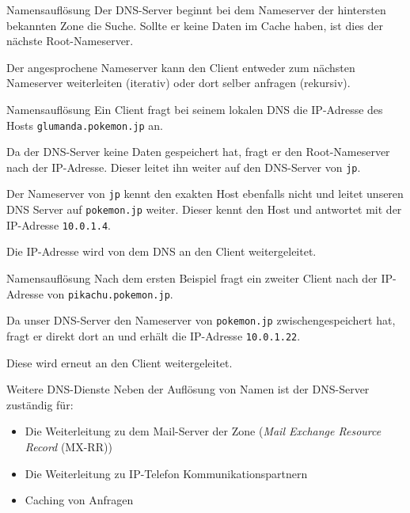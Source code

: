 \begin{defi}{Namensauflösung}
    Der DNS-Server beginnt bei dem Nameserver der hintersten bekannten Zone die Suche.
    Sollte er keine Daten im Cache haben, ist dies der nächste Root-Nameserver.

    Der angesprochene Nameserver kann den Client entweder zum nächsten Nameserver weiterleiten (iterativ) oder dort selber anfragen (rekursiv).
\end{defi}

\begin{example}{Namensauflösung}
    Ein Client fragt bei seinem lokalen DNS die IP-Adresse des Hosts \texttt{glumanda.pokemon.jp} an.

    Da der DNS-Server keine Daten gespeichert hat, fragt er den Root-Nameserver nach der IP-Adresse.
    Dieser leitet ihn weiter auf den DNS-Server von \texttt{jp}.

    Der Nameserver von \texttt{jp} kennt den exakten Host ebenfalls nicht und leitet unseren DNS Server auf \texttt{pokemon.jp} weiter.
    Dieser kennt den Host und antwortet mit der IP-Adresse \texttt{10.0.1.4}.

    Die IP-Adresse wird von dem DNS an den Client weitergeleitet.
\end{example}

\begin{example}{Namensauflösung}
    Nach dem ersten Beispiel fragt ein zweiter Client nach der IP-Adresse von \texttt{pikachu.pokemon.jp}.

    Da unser DNS-Server den Nameserver von \texttt{pokemon.jp} zwischengespeichert hat, fragt er direkt dort an und erhält die IP-Adresse \texttt{10.0.1.22}.

    Diese wird erneut an den Client weitergeleitet.
\end{example}

\begin{bonus}{Weitere DNS-Dienste}
    Neben der Auflösung von Namen ist der DNS-Server zuständig für:
    \begin{itemize}
        \item Die Weiterleitung zu dem Mail-Server der Zone (\emph{Mail Exchange Resource Record} (MX-RR))
        \item Die Weiterleitung zu IP-Telefon Kommunikationspartnern
        \item Caching von Anfragen
    \end{itemize}
\end{bonus}

